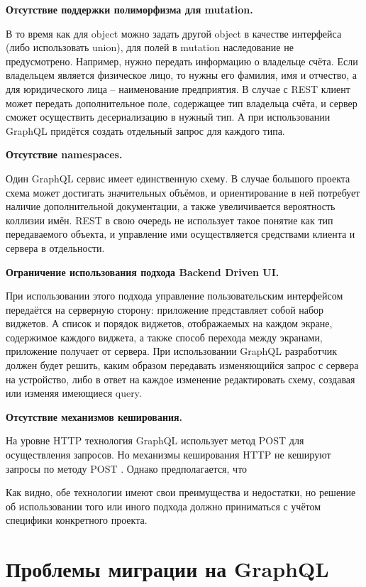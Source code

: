 \textbf{Отсутствие поддержки полиморфизма для mutation.}\label{graphql-disadvantage-polymorphism}

В то время как для object можно задать другой object в качестве интерфейса (либо использовать union), для полей в mutation наследование не предусмотрено.
Например, нужно передать информацию о владельце счёта.
Если владельцем является физическое лицо, то нужны его фамилия, имя и отчество, а для юридического лица – наименование предприятия.
В случае с REST клиент может передать дополнительное поле, содержащее тип владельца счёта, и сервер сможет осуществить десериализацию в нужный тип.
А при использовании GraphQL придётся создать отдельный запрос для каждого типа.

\textbf{Отсутствие namespaces.}\label{graphql-disadvantage-namespaces}

Один GraphQL сервис имеет единственную схему.
В случае большого проекта схема может достигать значительных объёмов, и ориентирование в ней потребует наличие дополнительной документации, а также увеличивается вероятность коллизии имён.
REST в свою очередь не использует такое понятие как тип передаваемого объекта, и управление ими осуществляется средствами клиента и сервера в отдельности.

\textbf{Ограничение использования подхода Backend Driven UI.}\label{graphql-disadvantage-backend-driven-ui}

При использовании этого подхода управление пользовательским интерфейсом передаётся на серверную сторону: приложение представляет собой набор виджетов.
А список и порядок виджетов, отображаемых на каждом экране, содержимое каждого виджета, а также способ перехода между экранами, приложение получает от сервера.
При использовании GraphQL разработчик должен будет решить, каким образом передавать изменяющийся запрос с сервера на устройство, либо в ответ на каждое изменение редактировать схему, создавая или изменяя имеющиеся query.

\textbf{Отсутствие механизмов кеширования.}\label{graphql-disadvantage-caching}

На уровне HTTP технология GraphQL использует метод POST для осуществления запросов.
Но механизмы кеширования HTTP не кешируют запросы по методу POST \cite{graphqlcaching}.
Однако предполагается, что


Как видно, обе технологии имеют свои преимущества и недостатки, но решение об использовании того или иного подхода должно приниматься с учётом специфики конкретного проекта.


\section{Проблемы миграции на GraphQL}\label{sec:migration-to-graphql}\label{graphql-disadvantage-migration}

